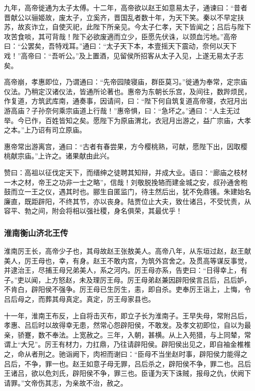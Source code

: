 \documentclass[]{article}
\begin{document}
九年，高帝徙通为太子太傅。十二年，高帝欲以赵王如意易太子，通谏曰：``昔者晋献公以骊姬故，废太子，立奚齐，晋国乱者数十年，为天下笑。秦以不早定扶苏，故亥诈立，自使灭祀，此陛下所亲见。今太子仁孝，天下皆闻之；吕后与陛下攻苦食啖，其可背哉！陛下必欲废適而立少，臣愿先伏诛，以颈血污地。''高帝曰：``公罢矣，吾特戏耳。''通曰：``太子天下本，本壹摇天下震动，奈何以天下戏！''高帝曰：``吾听公。''及上置酒，见留侯所招客从太子入见，上遂无易太子志矣。

高帝崩，孝惠即位，乃谓通曰：``先帝园陵寝庙，群臣莫习。''徙通为奉常，定宗庙仪法。乃稍定汉诸仪法，皆通所论著也。惠帝为东朝长乐宫，及间往，数跸烦民，作复道，方筑武库南，通奏事，因请间，曰：``陛下何自筑复道高帝寝，衣冠月出游高庙？子孙奈何乘宗庙道上行哉！''惠帝惧，曰：``急坏之。''通曰：``人主无过举。今已作，百姓皆知之矣。愿陛下为原庙渭北，衣冠月出游之，益广宗庙，大孝之本。''上乃诏有司立原庙。

惠帝常出游离宫，通曰：``古者有春尝果，方今樱桃熟，可献，愿陛下出，因取樱桃献宗庙。''上许之。诸果献由此兴。

赞曰：高祖以征伐定天下，而缙绅之徒聘其知辩，并成大业。语曰：``廊庙之枝材一木之材，帝王之功非一士之略''，信哉！刘敬脱挽辂而建金城之安，叔孙通舍枹鼓而立一王之仪，遇其时也。郦生自匿监门，待主然后出，犹不免鼎镬。朱建始名廉直，既距辟阳，不终其节，亦以丧身。陆贾位止大夫，致仕诸吕，不受忧责，从容平、勃之间，附会将相以强社稷，身名俱荣，其最优乎！

\hypertarget{header-n3953}{%
\subsubsection{淮南衡山济北王传}\label{header-n3953}}

淮南厉王长，高帝少子也，其母故赵王张敖美人。高帝八年，从东垣过赵，赵王献美人，厉王母也，幸，有身。赵王不敢内宫，为筑外宫舍之。及贯高等谋反事觉，并逮治王，尽捕王母兄弟美人，系之河内。厉王母亦系，告吏曰：``日得幸上，有子。''吏以闻，上方怒赵，未及理厉王母。厉王母弟赵兼因辟阳侯言吕后，吕后妒，不肯白，辟阳侯不强争。厉王母已生厉生，恚，即自杀。吏奉厉王诣上，上悔，令吕后母之，而葬其母真定。真定，厉王母家县也。

十一年，淮南王布反，上自将击灭布，即立子长为淮南子。王早失母，常附吕后，孝惠、吕后时以故得幸无患，然常心怨辟阳侯，不敢发。及孝文初即位，自以为最亲，骄蹇，数不奉法。上宽赦之。三年，入朝，甚横。从上入苑猎，与上同辇，常谓上``大兄''。厉王有材力，力扛鼎，乃往请辟阳侯。辟阳侯出见之，即自袖金椎椎之，命从者刑之。驰诣阙下，肉袒而谢曰：``臣母不当坐赵时事，辟阳侯力能得之吕后，不争，罪一也。赵王如意子母无罪，吕后杀之，辟阳侯不争，罪二也。吕后王诸吕，欲以危刘氏，辟阳侯不争，罪三也。臣谨为天下诛贼，报母之仇，伏阙下请罪。''文帝伤其志，为亲故不治，赦之。
\end{document}
